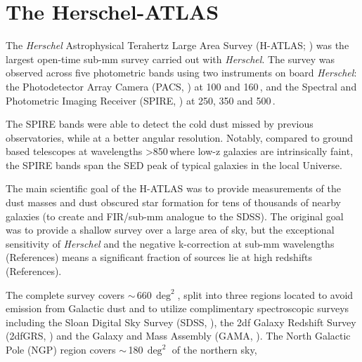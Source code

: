 \section{The Herschel-ATLAS}
The \textit{Herschel} Astrophysical Terahertz Large Area Survey (H-ATLAS; \citealt{Eales_2010}) was the largest open-time sub-mm survey carried out with \textit{Herschel}. The survey was observed across five photometric bands using two instruments on board \textit{Herschel}: the Photodetector Array Camera (PACS, \citealt{Poglitsch_2010}) at 100 and 160\,\micron, and the Spectral and Photometric Imaging Receiver (SPIRE, \citealt{Griffin_2010}) at 250, 350 and 500\,\micron.

{\color{orange} The SPIRE bands were able to detect the cold dust missed by previous observatories, while at a better angular resolution. Notably, compared to ground based telescopes at wavelengths >850\,\micron where low-z galaxies are intrinsically faint, the SPIRE bands span the SED peak of typical galaxies in the local Universe.}

{\color{orange}The main scientific goal of the H-ATLAS was to provide measurements of the dust masses and dust obscured star formation for tens of thousands of nearby galaxies (to create and FIR/sub-mm analogue to the SDSS). The original goal was to provide a shallow survey over a large area of sky, but the exceptional sensitivity of \textit{Herschel} and the negative k-correction at sub-mm wavelengths (References) means a significant fraction of sources lie at high redshifts (References).}

The complete survey covers $\sim$\,660\,$\deg^2$, split into three regions located to avoid emission from Galactic dust and to utilize complimentary spectroscopic surveys including the Sloan Digital Sky Survey (SDSS, \citealt{York_2000}), the 2df Galaxy Redshift Survey (2dfGRS, \citealt{Colless_2001}) and the Galaxy and Mass Assembly (GAMA, \citealt{Driver_2009}). The North Galactic Pole (NGP) region covers $\sim$\,180\,$\deg^2$ of the northern sky,